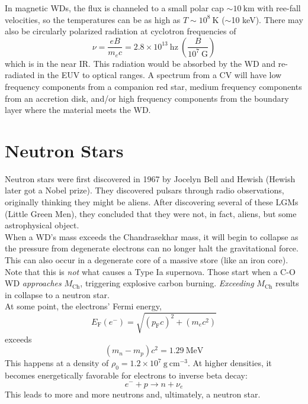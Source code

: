 \documentclass[10pt]{article}
\numberwithin{equation}{section}
\newcommand{\n}{\noindent}
\begin{document}
	\n In magnetic WDs, the flux is channeled to a small polar cap $\sim 10\ \mathrm{km}$ with ree-fall velocities, so the temperatures can be as high as $T\sim 10^8\ \mathrm{K}$ ($\sim$10 keV). There may also be circularly polarized radiation at cyclotron frequencies of
	\begin{equation}
		\label{eq:cv:7} \nu = \frac{eB}{m_e c} = 2.8\times 10^{13}\ \mathrm{hz}\ \left(\frac{B}{10^7\ \mathrm{G}}\right)
	\end{equation}
	which is in the near IR. This radiation would be absorbed by the WD and re-radiated in the EUV to optical ranges. A spectrum from a CV will have low frequency components from a companion red star, medium frequency components from an accretion disk, and/or high frequency components from the boundary layer where the material meets the WD.
	\section{Neutron Stars} %
	\label{sec:neutron_stars}
	Neutron stars were first discovered in 1967 by Jocelyn Bell and Hewish (Hewish later got a Nobel prize). They discovered pulsars through radio observations, originally thinking they might be aliens. After discovering several of these LGMs (Little Green Men), they concluded that they were not, in fact, aliens, but some astrophysical object.\\
	
	\n When a WD's mass exceeds the Chandrasekhar mass, it will begin to collapse as the pressure from degenerate electrons can no longer halt the gravitational force. This can also occur in a degenerate core of a massive store (like an iron core). Note that this is \emph{not} what causes a Type Ia supernova. Those start when a C-O WD \emph{approaches} $M_{\mathrm{Ch}}$, triggering explosive carbon burning. \emph{Exceeding} $M_{\mathrm{Ch}}$ results in collapse to a neutron star.\\
	
	\n At some point, the electrons' Fermi energy,
	\begin{equation}
		\label{eq:neutron:1} E_{\mathrm{F}}(e^-) = \sqrt{(p_{\mathrm{F}}c)^2 + (m_ec^2)}
	\end{equation}
	exceeds
	\begin{equation}
		\label{eq:neutron:2} (m_n - m_p)c^2 = 1.29\ \mathrm{MeV}
	\end{equation}
	This happens at a density of $\rho_0 = 1.2\times 10^7\ \mathrm{g\ cm^{-3}}$. At higher densities, it becomes energetically favorable for electrons to inverse beta decay:
	\begin{equation}
		\label{eq:neutron:3} e^- + p \to n + \nu_e
	\end{equation}
	This leads to more and more neutrons and, ultimately, a neutron star.\\
	
\end{document}
